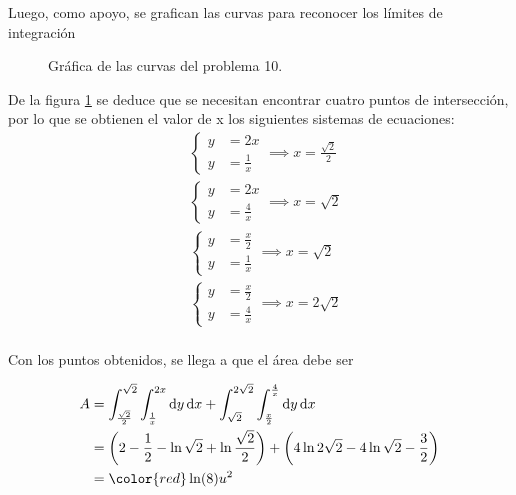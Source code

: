\documentclass[12pt]{article}
\DeclareMathOperator{\di}{d\!}
\begin{document}
Luego, como apoyo, se grafican las curvas para reconocer los límites de integración
\begin{figure}
\centering
{}
	\caption{Gráfica de las curvas del problema 10.}
	\label{ej10}
\end{figure}

De la figura \ref{ej10} se deduce que se necesitan encontrar cuatro puntos de intersección,
por lo que se obtienen el valor de x los siguientes sistemas de ecuaciones:
\begin{align*}
	&\begin{cases}
		y &= 2x \\
		y &= \frac{1}{x}
	\end{cases}	
	\implies x = \frac{\sqrt{2}}{2}	\\
	&\begin{cases}
		y &= 2x \\
		y &= \frac{4}{x}
	\end{cases}	
	\implies x = \sqrt{2} \\
	&\begin{cases}
		y &= \frac{x}{2} \\
		y &= \frac{1}{x}
	\end{cases}	
	\implies x = \sqrt{2} \\
	&\begin{cases}
		y &= \frac{x}{2} \\
		y &= \frac{4}{x}
	\end{cases}	
	\implies x = 2\sqrt{2} \\
\end{align*}

Con los puntos obtenidos, se llega a que el área debe ser

\begin{align*}
	A &= \int_{\frac{\sqrt{2}}{2}}^{\sqrt{2}}\int_{\frac{1}{x}}^{2x} \di y \di x
	+ \int_{\sqrt{2}}^{2\sqrt{2}}\int_{\frac{x}{2}}^{\frac{4}{x}} \di y \di x \\
	&=\left(2-\frac{1}{2}-\ln{\sqrt{2}}+ \ln{\frac{\sqrt{2}}{2}}\right) 
	+\left(4\ln{2\sqrt{2}}-4\ln{\sqrt{2}}-\frac{3}{2}\right) \\
	&=\color{red}\ln(8) u^2
\end{align*}
\end{document}

